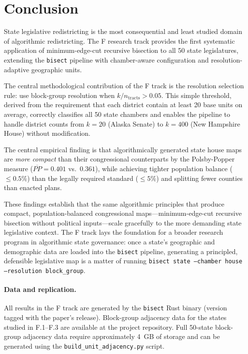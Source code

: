 \section{Conclusion}
\label{sec:conclusion}

State legislative redistricting is the most consequential and least studied
domain of algorithmic redistricting. The F research track provides the first
systematic application of minimum-edge-cut recursive bisection to all 50 state
legislatures, extending the \texttt{bisect} pipeline with chamber-aware
configuration and resolution-adaptive geographic units.

The central methodological contribution of the F track is the resolution
selection rule: use block-group resolution when $k/n_{\mathrm{tracts}} > 0.05$.
This simple threshold, derived from the requirement that each district contain
at least 20 base units on average, correctly classifies all 50 state chambers
and enables the pipeline to handle district counts from $k=20$ (Alaska Senate)
to $k=400$ (New Hampshire House) without modification.

The central empirical finding is that algorithmically generated state house maps
are \emph{more compact} than their congressional counterparts by the Polsby-Popper
measure ($\overline{PP} = 0.401$ vs.\ $0.361$), while achieving tighter
population balance ($\leq 0.5\%$) than the legally required standard
($\leq 5\%$) and splitting fewer counties than enacted plans.

These findings establish that the same algorithmic principles that produce
compact, population-balanced congressional maps---minimum-edge-cut recursive
bisection without political inputs---scale gracefully to the more demanding
state legislative context. The F track lays the foundation for a broader
research program in algorithmic state governance: once a state's geographic
and demographic data are loaded into the \texttt{bisect} pipeline, generating
a principled, defensible legislative map is a matter of running
\texttt{bisect state --chamber house --resolution block\_group}.

\paragraph{Data and replication.}
All results in the F track are generated by the \texttt{bisect} Rust binary
(version tagged with the paper's release). Block-group adjacency data for
the states studied in F.1--F.3 are available at the project repository.
Full 50-state block-group adjacency data require approximately 4~GB of storage
and can be generated using the \texttt{build\_unit\_adjacency.py} script.
